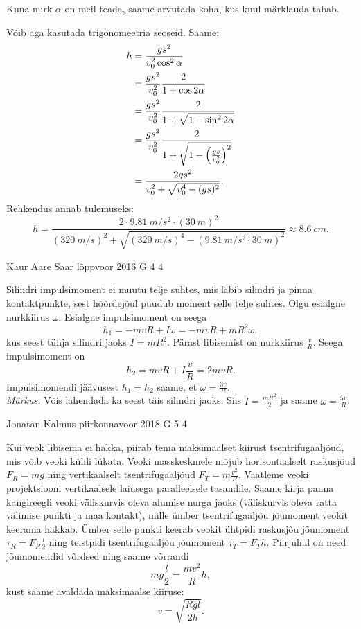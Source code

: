 \documentclass[11pt, twoside]{article}
\begin{document}
{{Kuna nurk $\alpha$ on meil teada, saame arvutada koha, kus kuul märklauda tabab.

Võib aga kasutada trigonomeetria seoseid. Saame:
\begin{align*}
h & = {gs^2 \over v_{0}^2\cos^2\alpha}\\
& = {gs^2 \over v_{0}^2}{2 \over 1+\cos2\alpha}\\
& = {gs^2 \over v_{0}^2}{2 \over 1+\sqrt{1-\sin^2 2\alpha}}\\
& = {gs^2 \over v_{0}^2}{2 \over 1+\sqrt{1-\Big({gs \over v_0^2}\Big)^2}}\\
& = {2gs^2 \over v_0^2+\sqrt{v_0^4-(gs)^2}}.
\end{align*}
Rehkendus annab tulemuseks:
$$
h = \frac{2\cdot \SI{9,81}{m/s^2} \cdot (\SI{30}{m})^2}{(\SI{320}{m/s})^2+\sqrt{(\SI{320}{m/s})^4-(\SI{9,81}{m/s^2} \cdot \SI{30}{m})^2}} \approx \SI{8,6}{cm}.
$$
\fi
}

{Kaur Aare Saar} %
{lõppvoor} %
{2016} %
{G 4} %
{4} %
{

\ifSolution
Silindri impulsimoment ei muutu telje suhtes, mis läbib silindri ja pinna kontaktpunkte, sest hõõrdejõul puudub moment selle telje suhtes. Olgu esialgne nurkkiirus $\omega$. Esialgne impulsimoment on seega
\[
h_1=-mvR+I\omega=-mvR+mR^2\omega,
\]
kus seest tühja silindri jaoks $I=mR^2$. Pärast libisemist on nurkkiirus $\frac{v}{R}$. Seega impulsimoment on
\[
h_2=mvR+I\frac{v}{R}=2mvR.
\]
Impulsimomendi jäävusest $h_1=h_2$ saame, et $\omega=\frac{3v}{R}$.\\
\emph{Märkus.} Võis lahendada ka seest täis silindri jaoks. Siis $I=\frac{mR^2}{2}$ ja saame $\omega = \frac{5v}{R}$.
\fi
}

{Jonatan Kalmus} %
{piirkonnavoor} %
{2018} %
{G 5} %
{4} %
{

\ifSolution
Kui veok libisema ei hakka, piirab tema maksimaalset kiirust tsentrifugaaljõud, mis võib veoki külili lükata. Veoki masskeskmele mõjub horisontaalselt raskusjõud $F_R=mg$ ning vertikaalselt tsentrifugaaljõud $F_T=m\frac{v^2}{R}$. 
Vaatleme veoki projektsiooni vertikaalsele laiusega paralleelsele tasandile. Saame kirja panna kangireegli veoki väliskurvis oleva alumise nurga jaoks (väliskurvis oleva ratta välimise punkti ja maa kontakt), mille ümber tsentrifugaaljõu jõumoment veokit keerama hakkab. Ümber selle punkti keerab veokit ühtpidi raskusjõu jõumoment $\tau_R=F_R\frac{l}{2}$ ning teistpidi tsentrifugaaljõu jõumoment $\tau_T=F_T h$. Piirjuhul on need jõumomendid võrdsed ning saame võrrandi
$$mg\frac{l}{2}=\frac{mv^2}{R}h,$$ 
kust saame avaldada maksimaalse kiiruse:
$$v=\sqrt{\frac{Rgl}{2h}}.$$ 
\fi
}

}
\end{document}
